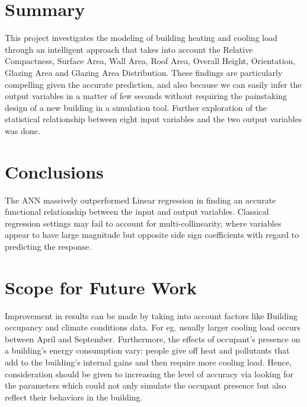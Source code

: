\section{Summary}
This project investigates the modeling of building heating and cooling load through an intelligent approach that takes into account the
Relative Compactness, Surface Area, Wall Area, Roof Area, Overall Height, Orientation, Glazing Area and Glazing Area Distribution. These findings are particularly compelling given the accurate prediction, and also because we can easily infer the output variables in a matter of few seconds
without requiring the painstaking design of a new building in a simulation tool. 
Further exploration of the statistical relationship between eight input variables and the two output variables was done.

\section{Conclusions}
The ANN massively outperformed Linear regression in finding an accurate functional relationship between the input and output variables. Classical regression settings may fail to account for multi-collinearity, where variables appear to have large magnitude but opposite side sign coefficients with regard to predicting the response.

\section{Scope for Future Work}
Improvement in results can be made by taking into account factors like Building occupancy and climate conditions data. For eg. usually
larger cooling load occurs between April and September.
Furthermore, the effects of occupant’s presence on a building’s energy consumption vary: people give off heat and pollutants that add to the building’s internal gains and then require more cooling load.
Hence, consideration should be given to increasing the level of accuracy via looking for the parameters which could not only simulate the occupant presence but also reflect their behaviors in the building.
